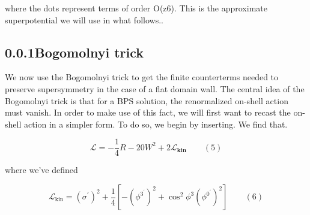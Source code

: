 \documentclass{article}
\begin{document}
where the dots represent terms of order O(z6). This is the approximate superpotential we
will use in what follows..


\subsection*{0.0.1Bogomolnyi trick}


We now use the Bogomolnyi trick to get the finite counterterms needed to preserve supersymmetry in the case of a flat domain wall. The central idea of the Bogomolnyi trick is that
for a BPS solution, the renormalized on-shell action must vanish. In order to make use of
this fact, we will first want to recast the on-shell action in a simpler form. To do so, we
begin by inserting. We find that.


\begin{equation}
\mathcal { L } = - \frac { 1 } { 4 } R - 2 0 W ^ { 2 } + 2 \mathcal { L } _ \mathbf { k i n } \qquad ( 5 )
\end{equation}


where we've defined


\begin{equation}
{ \mathcal { L } } _ { \mathrm { k i n } } = ( \sigma ^ { \prime } ) ^ { 2 } + { \frac { 1 } { 4 } } \left [ - ( { \phi ^ { 3 ^ { \prime } } } ) ^ { 2 } + \cos ^ { 2 } \phi ^ { 3 } ( { \phi ^ { 0 ^ { \prime } } } ) ^ { 2 } \right ] \qquad ( 6 )
\end{equation}
\end{document}
